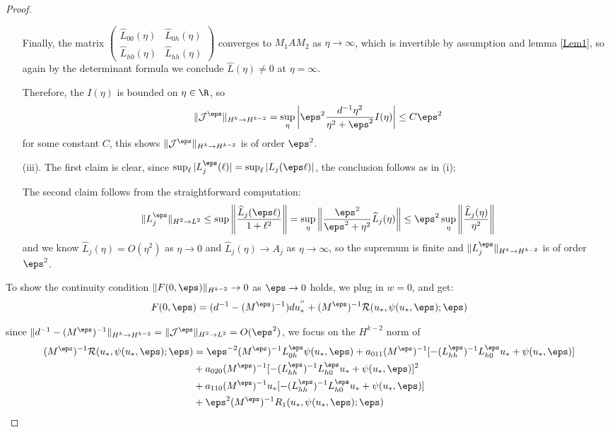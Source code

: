 \begin{proof}
\begin{enumerate}
Finally, the matrix $\begin{pmatrix}
\widehat{L}_{00}(\eta) &  \widehat{L}_{0h}(\eta) \\
\widehat{L}_{h0}(\eta) & \widehat{L}_{hh}(\eta)
\end{pmatrix}$ converges to $M_1AM_2$ as $\eta \to \infty$, which is invertible by assumption and lemma \ref{Lem1}, so again by the determinant formula we conclude $\widehat{L}(\eta) \neq 0$ at $\eta  = \infty$.


Therefore, the $I(\eta)$ is bounded on $\eta \in \R$, so
\[
\| \mathcal{J}^{\eps} \|_{H^k \to H^{k-2}} =  \sup_{\eta}\left| \eps^2 \frac{d^{-1}\eta^2}{\eta^2+\eps^2}I(\eta) \right| \le C \eps^2
\]
for some constant $C$, this shows $\|\mathcal{J}^{\eps}\|_{H^k \to H^{k-2}}$ is of order $\eps^2$.


\item[(iii).] The first  claim is clear, since $\sup_{\ell}|L_{j}^{\eps}(\ell)|=\sup_{\ell}|L_j(\eps\ell)|$, the conclusion follows as in (i);

The second claim follows from the straightforward computation:
\[
\|L_{j}^{\eps}\|_{H^2 \to L^{2}} \le \sup \left\|\frac{\widehat{L}_j(\eps\ell)}{1+\ell^2}\right\|=\sup_{\eta}\left\| \frac{\eps^2}{\eps^2+\eta^2}\widehat{L}_j(\eta)\right\| \le \eps^2 \sup_{\eta}\left\|\frac{\widehat{L}_j(\eta)}{\eta^2}\right\|
\]
and we know $\widehat{L}_j(\eta)= O(\eta^2)$ as $\eta \to 0$ and $\widehat{L}_j(\eta) \to A_j$ as $\eta \to \infty$, so the supremum is finite and $\|L_{j}^{\eps}\|_{H^k\to H^{k-2}}$ is of order $\eps^2$.

\end{enumerate}

To show the continuity condition $\|F(0,\eps)\|_{H^{k-2}} \to 0$ as $\eps \to 0$ holds, we plug in $w = 0$, and get:
\[
F(0,\eps) = (d^{-1}-(M^{\eps})^{-1})du_*^{''} + (M^{\eps})^{-1} \mathcal{R}(u_*,\psi(u_*,\eps);\eps)
\] 

since $\|d^{-1}-(M^{\eps})^{-1}\|_{H^k \to H^{k-2}}  = \|\mathcal{J}^{\eps}\|_{H^2 \to L^2} = O(\eps^2)$, we focus on the $H^{k-2}$ norm of
\begin{align*}
(M^{\eps})^{-1}\mathcal{R} (u_*,\psi(u_*,\eps);\eps)&= \eps^{-2}(M^{\eps})^{-1}L_{0h}^{\eps}\psi(u_*,\eps)+a_{011}(M^{\eps})^{-1}[-(L_{hh}^{\eps})^{-1}L_{h0}^{\eps}u_*+\psi(u_*,\eps)]\\
&+a_{020}(M^{\eps})^{-1}[-(L_{hh}^{\eps})^{-1}L_{h0}^{\eps}u_*+\psi(u_*,\eps)]^2\\
&+a_{110}(M^{\eps})^{-1}u_*[-(L_{hh}^{\eps})^{-1}L_{h0}^{\eps}u_*+\psi(u_*,\eps)]\\
&+\eps^2(M^{\eps})^{-1}R_1(u_*,\psi(u_*,\eps);\eps)
\end{align*}


\end{proof}

